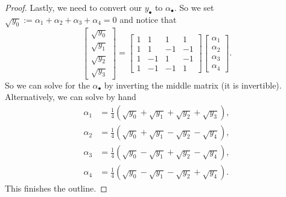 \documentclass[../notes.tex]{subfiles}
\begin{document}
\begin{proof}
	Lastly, we need to convert our $y_\bullet$ to $\alpha_\bullet.$ So we set $\sqrt{y_0}:=\alpha_1+\alpha_2+\alpha_3+\alpha_4=0$ and notice that
	\[\begin{bmatrix}
		\sqrt{y_0} \\
		\sqrt{y_1} \\
		\sqrt{y_2} \\
		\sqrt{y_3}
	\end{bmatrix}=\begin{bmatrix}
		1 & 1 & 1 & 1 \\
		1 & 1 & -1 & -1 \\
		1 & -1 & 1 & -1 \\
		1 & -1 & -1 & 1
	\end{bmatrix}
	\begin{bmatrix}
		\alpha_1 \\
		\alpha_2 \\
		\alpha_3 \\
		\alpha_4
	\end{bmatrix}.\]
	So we can solve for the $\alpha_\bullet$ by inverting the middle matrix (it is invertible). Alternatively, we can solve by hand
	\begin{align*}
		\alpha_1 &= {\textstyle\frac14}\left(\sqrt{y_0}+\sqrt{y_1}+\sqrt{y_2}+\sqrt{y_3}\right), \\
		\alpha_2 &= {\textstyle\frac14}\left(\sqrt{y_0}+\sqrt{y_1}-\sqrt{y_2}-\sqrt{y_4}\right), \\
		\alpha_3 &= {\textstyle\frac14}\left(\sqrt{y_0}-\sqrt{y_1}+\sqrt{y_2}-\sqrt{y_4}\right), \\
		\alpha_4 &= {\textstyle\frac14}\left(\sqrt{y_0}-\sqrt{y_1}-\sqrt{y_2}+\sqrt{y_4}\right).
	\end{align*}
	This finishes the outline.
\end{proof}
\end{document}
